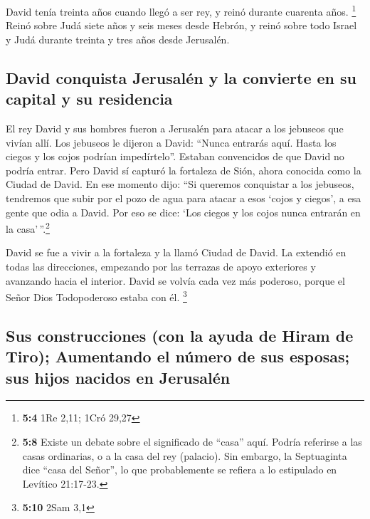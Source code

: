  David tenía treinta años cuando llegó a ser rey, y reinó
durante cuarenta años. \footnote{\textbf{5:4} 1Re 2,11; 1Cró 29,27}
 Reinó sobre Judá siete años y seis meses desde Hebrón, y
reinó sobre todo Israel y Judá durante treinta y tres años desde
Jerusalén.

\hypertarget{david-conquista-jerusaluxe9n-y-la-convierte-en-su-capital-y-su-residencia}{%
\subsection{David conquista Jerusalén y la convierte en su capital y su
residencia}\label{david-conquista-jerusaluxe9n-y-la-convierte-en-su-capital-y-su-residencia}}

 El rey David y sus hombres fueron a Jerusalén para atacar
a los jebuseos que vivían allí. Los jebuseos le dijeron a David: ``Nunca
entrarás aquí. Hasta los ciegos y los cojos podrían impedírtelo''.
Estaban convencidos de que David no podría entrar.  Pero
David sí capturó la fortaleza de Sión, ahora conocida como la Ciudad de
David.  En ese momento dijo: ``Si queremos conquistar a
los jebuseos, tendremos que subir por el pozo de agua para atacar a esos
`cojos y ciegos', a esa gente que odia a David. Por eso se dice: `Los
ciegos y los cojos nunca entrarán en la casa'\,''.\footnote{\textbf{5:8}
  Existe un debate sobre el significado de ``casa'' aquí. Podría
  referirse a las casas ordinarias, o a la casa del rey (palacio). Sin
  embargo, la Septuaginta dice ``casa del Señor'', lo que probablemente
  se refiera a lo estipulado en Levítico 21:17-23.}

 David se fue a vivir a la fortaleza y la llamó Ciudad de
David. La extendió en todas las direcciones, empezando por las terrazas
de apoyo exteriores y avanzando hacia el interior.  David
se volvía cada vez más poderoso, porque el Señor Dios Todopoderoso
estaba con él. \footnote{\textbf{5:10} 2Sam 3,1}

\hypertarget{sus-construcciones-con-la-ayuda-de-hiram-de-tiro-aumentando-el-nuxfamero-de-sus-esposas-sus-hijos-nacidos-en-jerusaluxe9n}{%
\subsection{Sus construcciones (con la ayuda de Hiram de Tiro);
Aumentando el número de sus esposas; sus hijos nacidos en
Jerusalén}\label{sus-construcciones-con-la-ayuda-de-hiram-de-tiro-aumentando-el-nuxfamero-de-sus-esposas-sus-hijos-nacidos-en-jerusaluxe9n}}


